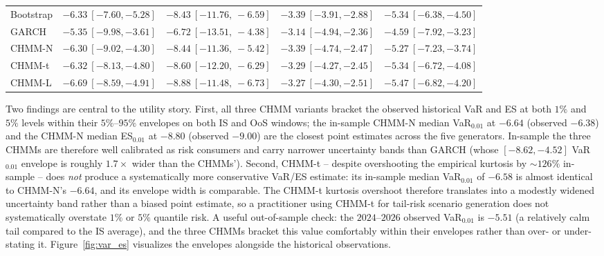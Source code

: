 \begin{table}[t]
{\begin{tabular}{l l l l l}
Bootstrap & $-6.33\ [-7.60, -5.28]$      & $-8.43\ [-11.76,\ -6.59]$    & $-3.39\ [-3.91, -2.88]$      & $-5.34\ [-6.38, -4.50]$      \\
GARCH     & $-5.35\ [-9.98, -3.61]$      & $-6.72\ [-13.51,\ -4.38]$    & $-3.14\ [-4.94, -2.36]$      & $-4.59\ [-7.92, -3.23]$      \\
CHMM-N    & $-6.30\ [-9.02, -4.30]$      & $-8.44\ [-11.36,\ -5.42]$    & $-3.39\ [-4.74, -2.47]$      & $-5.27\ [-7.23, -3.74]$      \\
CHMM-t    & $-6.32\ [-8.13, -4.80]$      & $-8.60\ [-12.20,\ -6.29]$    & $-3.29\ [-4.27, -2.45]$      & $-5.34\ [-6.72, -4.08]$      \\
CHMM-L    & $-6.69\ [-8.59, -4.91]$      & $-8.88\ [-11.48,\ -6.73]$    & $-3.27\ [-4.30, -2.51]$      & $-5.47\ [-6.82, -4.20]$      \\
\bottomrule
\end{tabular}%
}
\end{table}

Two findings are central to the utility story.
First, all three CHMM variants bracket the observed historical VaR and ES at both $1\%$ and $5\%$ levels within their $5\%$--$95\%$ envelopes on both IS and OoS windows; the in-sample CHMM-N median VaR$_{0.01}$ at $-6.64$ (observed $-6.38$) and the CHMM-N median ES$_{0.01}$ at $-8.80$ (observed $-9.00$) are the closest point estimates across the five generators.
In-sample the three CHMMs are therefore well calibrated as risk consumers and carry narrower uncertainty bands than GARCH (whose $[-8.62, -4.52]$ VaR$_{0.01}$ envelope is roughly $1.7\times$ wider than the CHMMs').
Second, CHMM-t -- despite overshooting the empirical kurtosis by $\sim 126\%$ in-sample -- does \emph{not} produce a systematically more conservative VaR/ES estimate: its in-sample median VaR$_{0.01}$ of $-6.58$ is almost identical to CHMM-N's $-6.64$, and its envelope width is comparable.
The CHMM-t kurtosis overshoot therefore translates into a modestly widened uncertainty band rather than a biased point estimate, so a practitioner using CHMM-t for tail-risk scenario generation does not systematically overstate $1\%$ or $5\%$ quantile risk.
A useful out-of-sample check: the $2024$--$2026$ observed VaR$_{0.01}$ is $-5.51$ (a relatively calm tail compared to the IS average), and the three CHMMs bracket this value comfortably within their envelopes rather than over- or under-stating it.
Figure~\ref{fig:var_es} visualizes the envelopes alongside the historical observations.

